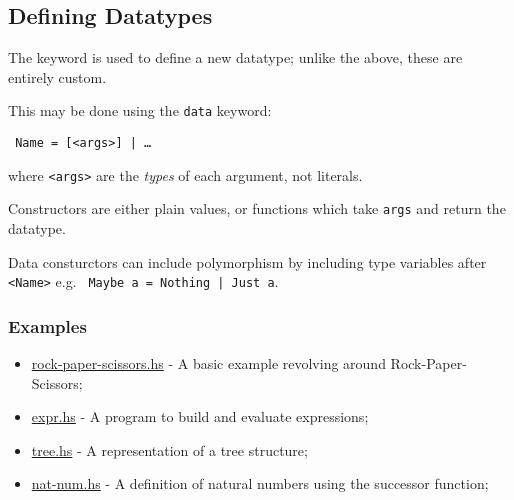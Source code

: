 \subsection{Defining Datatypes}
The  keyword is used to define a new datatype; unlike the above, these are entirely custom.

This may be done using the \texttt{data} keyword:
\begin{center}
  \texttt{ Name =  [<args>] | \ldots}
\end{center}
where \texttt{<args>} are the \textit{types} of each argument, not literals.

Constructors are either plain values, or functions which take \texttt{args} and return the datatype.

Data consturctors can include polymorphism by including type variables after \texttt{<Name>} e.g. \texttt{ Maybe a = Nothing | Just a}.

\subsubsection{Examples}
\begin{itemize}
  \item \url{rock-paper-scissors.hs} - A basic example revolving around Rock-Paper-Scissors;
  \item \url{expr.hs} - A program to build and evaluate expressions;
  \item \url{tree.hs} - A representation of a tree structure;
  \item \url{nat-num.hs} - A definition of natural numbers using the successor function;
\end{itemize}